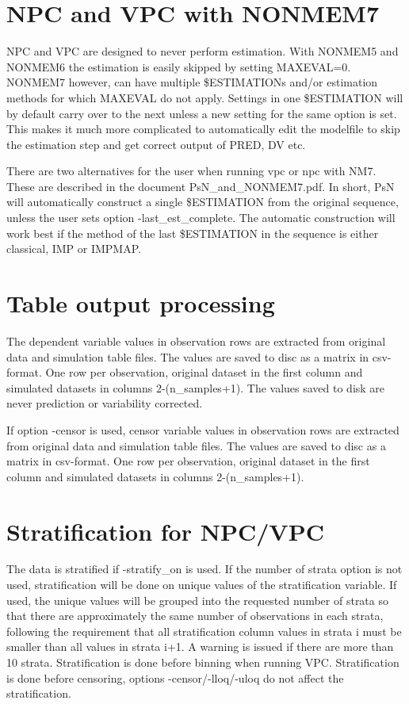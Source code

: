 \section{NPC and VPC with NONMEM7}
NPC and VPC are designed to never perform estimation. With NONMEM5 and NONMEM6 the estimation is easily skipped by setting MAXEVAL=0. NONMEM7 however,  can have multiple \$ESTIMATIONs and/or estimation methods for which MAXEVAL do not apply. Settings in one \$ESTIMATION will by default carry over to the next unless a new setting for the same option is set. This makes it much more complicated to automatically edit the modelfile to skip the estimation step and get correct output of PRED, DV etc. 

There are two alternatives for the user when running vpc or npc with NM7. These are described in the document PsN\_and\_NONMEM7.pdf. In short, PsN will automatically construct a single \$ESTIMATION from the original sequence, unless the user sets option -last\_est\_complete. The automatic construction will work best if the method of the last \$ESTIMATION in the sequence is either classical, IMP or IMPMAP.

\section{Table output processing}
The dependent variable values in observation rows are extracted from original data and simulation table files. The values are saved to disc as a matrix in csv-format. One row per observation, original dataset in the first column and simulated datasets in columns 2-(n\_samples+1). The values saved to disk are never prediction or variability corrected.

If option -censor is used, censor variable values in observation rows are extracted from original data and simulation table files. The values are saved to disc as a matrix in csv-format. One row per observation, original dataset in the first column and simulated datasets in columns 2-(n\_samples+1).

\section{Stratification for NPC/VPC}
The data is stratified if -stratify\_on is used. If the number of strata option is not used, stratification will be done on unique values of the stratification variable. If used, the unique values will be grouped into the requested number of strata so that there are approximately the same number of observations in each strata, following the requirement that all stratification column values in strata i must be smaller than all values in strata i+1. A warning is issued if there are more than 10 strata. Stratification is done before binning when running VPC. Stratification is done before censoring, options -censor/-lloq/-uloq do not affect the stratification.

